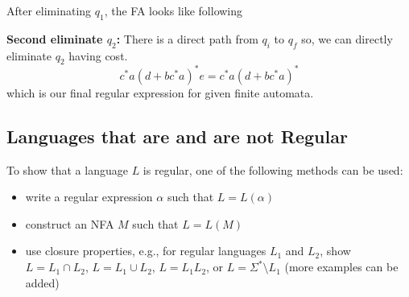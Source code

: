 \begin{multicols}{2}
\begin{examplebreak}{}
  After eliminating $q_1$, the FA looks like following
  \begin{center}
  \end{center}

  \textbf{Second eliminate $q_2$:}
  There is a direct path from $q_i$ to $q_f$ so, we can directly eliminate $q_2$ having cost.
  \begin{equation*}
    c^*a (d + bc^*a)^* e = c^*a (d + bc^*a)^*
  \end{equation*}
  which is our final regular expression for given finite automata.

\end{examplebreak}

\vfill\null
\columnbreak


\subsection{Languages that are and are not Regular}

To show that a language $L$ is regular, one of the following methods can be used:
\begin{itemize}
  \item write a regular expression $\alpha$ such that $L = L(\alpha)$
  \item construct an NFA $M$ such that $L = L(M)$
  \item use closure properties, e.g., for regular languages $L_1$ and $L_2$, show $L = L_1 \cap L_2$, $L = L_1 \cup L_2$, $L = L_1 L_2$,
  or $L = \Sigma^* \setminus L_1$ (more examples can be added)
\end{itemize}


\end{multicols}
